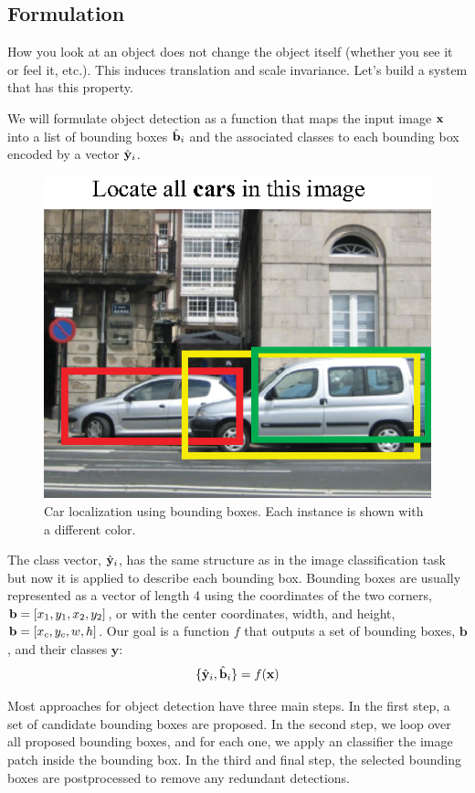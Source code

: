 
\subsection{Formulation}

How you look at an object does not change the object itself (whether you see it or feel it, etc.). This induces translation and scale invariance. Let's build a system that has this property. 

We will formulate object detection as a function that maps the input image ${\bf x}$ into a list of bounding boxes $\hat {\bf b}_i$ and the associated classes to each bounding box encoded by a vector $\hat {\bf y}_i$. 
\begin{figure}[h]
\centerline{
\includegraphics[width=0.4\linewidth]{figures/object_recognition/object_detection_bb.eps}
}
\caption{Car localization using bounding boxes. Each instance is shown with a different color.}
\label{fig:object_detection_bb}
\end{figure}


The class vector, $\hat {\bf y}_i$, has the same structure as in the image classification task but now it is applied to describe each bounding box. Bounding boxes are usually represented as a vector of length 4 using the coordinates of the two corners, ${\bf b} = \left[ x_1, y_1, x_2, y_2 \right]$, or with the center coordinates, width, and height, ${\bf b} = \left[ x_c, y_c, w, h \right]$. 
Our goal is a function $f$ that outputs a set of bounding boxes, $\mathbf{b}$, and their classes $\mathbf{y}$:
\begin{equation}
\{\hat {\bf y}_i, \hat {\bf b}_i\} = f({\bf x})
\end{equation}

Most approaches for object detection have three main steps. In the first step, a set of candidate bounding boxes are proposed. In the second step, we loop over all proposed bounding boxes, and for each one, we apply an classifier the image patch inside the bounding box. In the third and final step, the selected bounding boxes are postprocessed to remove any redundant detections. 

